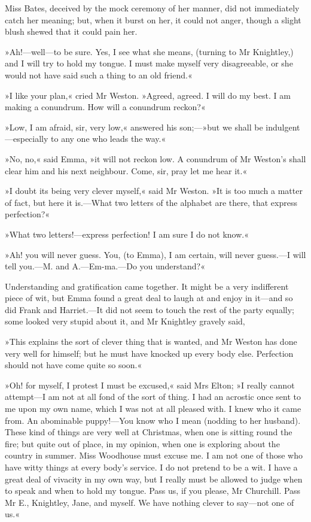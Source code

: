 Miss Bates, deceived by the mock ceremony of her manner, did not immediately catch her meaning; but, when it burst on her, it could not anger, though a slight blush shewed that it could pain her.

»Ah!—well—to be sure. Yes, I see what she means, (turning to Mr Knightley,) and I will try to hold my tongue. I must make myself very disagreeable, or she would not have said such a thing to an old friend.«

»I like your plan,« cried Mr Weston. »Agreed, agreed. I will do my best. I am making a conundrum. How will a conundrum reckon?«

»Low, I am afraid, sir, very low,« answered his son;—»but we shall be indulgent—especially to any one who leads the way.«

»No, no,« said Emma, »it will not reckon low. A conundrum of Mr Weston's shall clear him and his next neighbour. Come, sir, pray let me hear it.«

»I doubt its being very clever myself,« said Mr Weston. »It is too much a matter of fact, but here it is.—What two letters of the alphabet are there, that express perfection?«

»What two letters!—express perfection! I am sure I do not know.«

»Ah! you will never guess. You, (to Emma), I am certain, will never guess.—I will tell you.—M. and A.—Em-ma.—Do you understand?«

Understanding and gratification came together. It might be a very indifferent piece of wit, but Emma found a great deal to laugh at and enjoy in it—and so did Frank and Harriet.—It did not seem to touch the rest of the party equally; some looked very stupid about it, and Mr Knightley gravely said,

»This explains the sort of clever thing that is wanted, and Mr Weston has done very well for himself; but he must have knocked up every body else. Perfection should not have come quite so soon.«

»Oh! for myself, I protest I must be excused,« said Mrs Elton; »I really cannot attempt—I am not at all fond of the sort of thing. I had an acrostic once sent to me upon my own name, which I was not at all pleased with. I knew who it came from. An abominable puppy!—You know who I mean (nodding to her husband). These kind of things are very well at Christmas, when one is sitting round the fire; but quite out of place, in my opinion, when one is exploring about the country in summer. Miss Woodhouse must excuse me. I am not one of those who have witty things at every body's service. I do not pretend to be a wit. I have a great deal of vivacity in my own way, but I really must be allowed to judge when to speak and when to hold my tongue. Pass us, if you please, Mr Churchill. Pass Mr E., Knightley, Jane, and myself. We have nothing clever to say—not one of us.«


